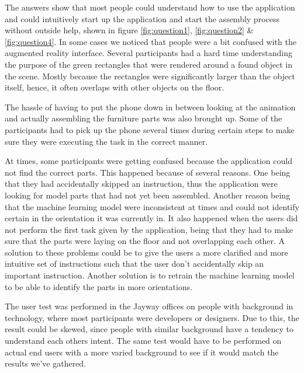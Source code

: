 The answers show that most people could understand how to use the application and 
could intuitively start up the application and start the assembly process without outside 
help, shown in figure \ref{fig:question1}, \ref{fig:question2} \& \ref{fig:question4}. In some cases we noticed that people were a bit confused with the augmented reality 
interface. Several participants had a hard time understanding the purpose of the green 
rectangles that were rendered around a found object in the scene. Mostly because the 
rectangles were significantly larger than the object itself, hence, it often overlaps with 
other objects on the floor.

The hassle of having to put the phone down in between looking at the animation and 
actually assembling the furniture parts was also brought up. Some of the participants had 
to pick up the phone several times during certain steps to make sure they were executing 
the task in the correct manner.

At times, some participants were getting confused because the application could not find 
the correct parts. This happened because of several reasons. One being that they had 
accidentally skipped an instruction, thus the application were looking for model parts that 
had not yet been assembled. Another reason being that the machine learning model were 
inconsistent at times and could not identify certain in the orientation it was currently in. It 
also happened when the users did not perform 
the first task given by the application, being that they had to make sure that the parts were 
laying on the floor and not overlapping each other. A solution to these problems could be 
to give the users a more clarified and more intuitive set of instructions such that the user 
don't accidentally skip an important instruction. Another solution is to retrain the machine 
learning model to be able to identify the parts in more orientations. 

The user test was performed in the Jayway offices on people with background in 
technology, where most participants were developers or designers. Due to this, the result 
could be skewed, since people with similar background have a tendency to understand 
each others intent. The same test would have to be performed on actual end users with a 
more varied background to see if it would match the results we've gathered.
\newpage